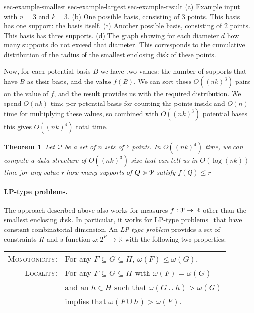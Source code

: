 \documentclass{journal}
\newcommand{\Eu}[1]{\ensuremath{\EuScript{#1}}}
\newcommand{\R}{\ensuremath{\mathbb{R}}}
\newcommand{\psets}{supports\xspace}
\newtheorem {theorem}{Theorem}[section]
\begin{document}
 {sec-example-smallest} {sec-example-largest} {sec-example-result}
{
  (a) Example input with $n = 3$ and $k = 3$. 
  (b) One possible basis, consisting of $3$ points. This basis has one support: the basis itself. 
  (c) Another possible basis, consisting of $2$ points. This basis has three \psets. 
  (d) The graph showing for each diameter $d$ how many \psets do not exceed that diameter. This corresponds to the cumulative distribution of the radius of the smallest enclosing disk of these points.
}


Now, for each potential basis $B$ we have two values: the number of \psets that have $B$ as their basis, and the value $f(B)$. We can sort these $O((nk)^3)$ pairs on the value of $f$, and the result provides us with the required distribution.
We spend $O(nk)$ time per potential basis for counting the points inside and $O(n)$ time for multiplying these values,
so combined with $O((nk)^3)$ potential bases this gives $O((nk)^4)$ total time.

\begin {theorem}
Let $\Eu P$ be a set of $n$ sets of $k$ points.
In $O ((nk)^4)$ time, we can compute a data structure of $O ((nk)^3)$ size that can tell us in $O(\log (nk))$ time for any value $r$ how many \psets of $Q \Subset \Eu P$ satisfy $f(Q) \leq r$.
\end {theorem}



\paragraph{LP-type problems.}

The approach described above also works for measures $f : \Eu P \to \R$ other than the smallest enclosing disk.  In particular, it works for LP-type problems~\cite{SW92} that have constant combinatorial dimension.
An \emph{LP-type problem} provides a set of constraints $H$ and a function $\omega : 2^H \to \R$ with the following two properties:

\begin{tabular} {rl} \textsc{Monotonicity:} & For any $F \subseteq G \subseteq H$, $\omega(F) \leq \omega(G)$.\\
\textsc{Locality:} & For any $F \subseteq G \subseteq H$ with $\omega(F) = \omega(G)$\\ &and an $h \in H$ such that $\omega(G \cup h) > \omega(G)$\\ &implies that $\omega(F \cup h) > \omega(F)$.\\
\end{tabular}
\end{document}

